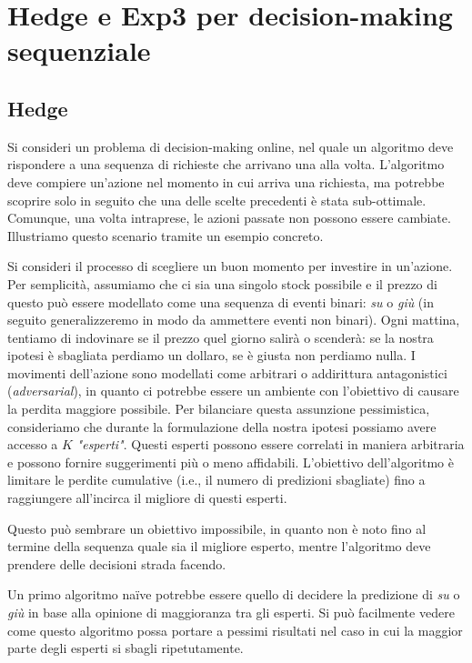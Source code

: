 \section{Hedge e Exp3 per decision-making sequenziale}
\label{sec:he3}

\subsection{Hedge}

Si consideri un problema di decision-making online, nel quale un algoritmo deve rispondere a una sequenza di richieste che arrivano una alla volta. L'algoritmo deve compiere un'azione nel momento in cui arriva una richiesta, ma potrebbe scoprire solo in seguito che una delle scelte precedenti è stata sub-ottimale. Comunque, una volta intraprese, le azioni passate non possono essere cambiate. Illustriamo questo scenario tramite un esempio concreto.

Si consideri il processo di scegliere un buon momento per investire in un'azione. Per semplicità, assumiamo che ci sia una singolo stock possibile e il prezzo di questo può essere modellato come una sequenza di eventi binari: \textit{su} o \textit{giù} (in seguito generalizzeremo in modo da ammettere eventi non binari). Ogni mattina, tentiamo di indovinare se il prezzo quel giorno salirà o scenderà: se la nostra ipotesi è sbagliata perdiamo un dollaro, se è giusta non perdiamo nulla. I movimenti dell'azione sono modellati come arbitrari o addirittura antagonistici (\textit{adversarial}), in quanto ci potrebbe essere un ambiente con l'obiettivo di causare la perdita maggiore possibile. Per bilanciare questa assunzione pessimistica, consideriamo che durante la formulazione della nostra ipotesi possiamo avere accesso a $K$ \textit{"esperti"}. Questi esperti possono essere correlati in maniera arbitraria e possono fornire suggerimenti più o meno affidabili. L'obiettivo dell'algoritmo è limitare le perdite cumulative (i.e., il numero di predizioni sbagliate) fino a raggiungere all'incirca il migliore di questi esperti.

Questo può sembrare un obiettivo impossibile, in quanto non è noto fino al termine della sequenza quale sia il migliore esperto, mentre l'algoritmo deve prendere delle decisioni strada facendo. 

Un primo algoritmo na\"ive potrebbe essere quello di decidere la predizione di \textit{su} o \textit{giù} in base alla opinione di maggioranza tra gli esperti. Si può facilmente vedere come questo algoritmo possa portare a pessimi risultati nel caso in cui la maggior parte degli esperti si sbagli ripetutamente. 

